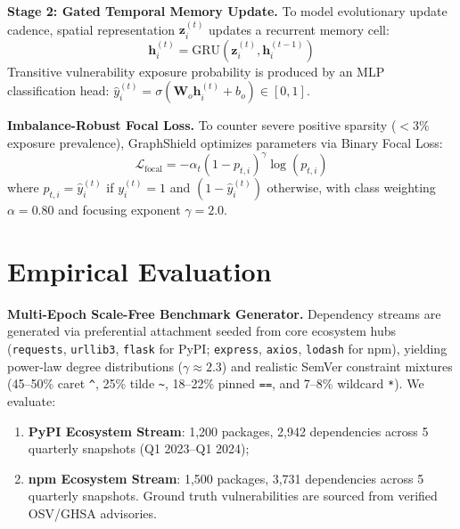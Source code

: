 \documentclass[sigconf,screen]{acmart}
\begin{document}
\noindent\textbf{Stage 2: Gated Temporal Memory Update.} To model evolutionary update cadence, spatial representation $\mathbf{z}_i^{(t)}$ updates a recurrent memory cell:
\begin{equation}
    \mathbf{h}_i^{(t)} = \text{GRU}\left(\mathbf{z}_i^{(t)}, \mathbf{h}_i^{(t-1)}\right)
\end{equation}
Transitive vulnerability exposure probability is produced by an MLP classification head: $\hat{y}_i^{(t)} = \sigma\left(\mathbf{W}_o \mathbf{h}_i^{(t)} + b_o\right) \in [0, 1]$.

\noindent\textbf{Imbalance-Robust Focal Loss.} To counter severe positive sparsity ($<3\%$ exposure prevalence), GraphShield optimizes parameters via Binary Focal Loss:
\begin{equation}
    \mathcal{L}_{\text{focal}} = -\alpha_t (1 - p_{t,i})^\gamma \log(p_{t,i})
\end{equation}
where $p_{t,i} = \hat{y}_i^{(t)}$ if $y_i^{(t)} = 1$ and $(1 - \hat{y}_i^{(t)})$ otherwise, with class weighting $\alpha = 0.80$ and focusing exponent $\gamma = 2.0$.



\section{Empirical Evaluation}
\label{sec:evaluation}

\noindent\textbf{Multi-Epoch Scale-Free Benchmark Generator.} Dependency streams are generated via preferential attachment seeded from core ecosystem hubs (\texttt{requests}, \texttt{urllib3}, \texttt{flask} for PyPI; \texttt{express}, \texttt{axios}, \texttt{lodash} for npm), yielding power-law degree distributions ($\gamma \approx 2.3$) and realistic SemVer constraint mixtures (45--50\% caret \texttt{\^{}}, 25\% tilde \texttt{\~{}}, 18--22\% pinned \texttt{==}, and 7--8\% wildcard \texttt{*}). We evaluate:
\begin{enumerate}
    \item \textbf{PyPI Ecosystem Stream}: 1,200 packages, 2,942 dependencies across 5 quarterly snapshots (Q1 2023--Q1 2024);
    \item \textbf{npm Ecosystem Stream}: 1,500 packages, 3,731 dependencies across 5 quarterly snapshots. Ground truth vulnerabilities are sourced from verified OSV/GHSA advisories.
\end{enumerate}
\end{document}
